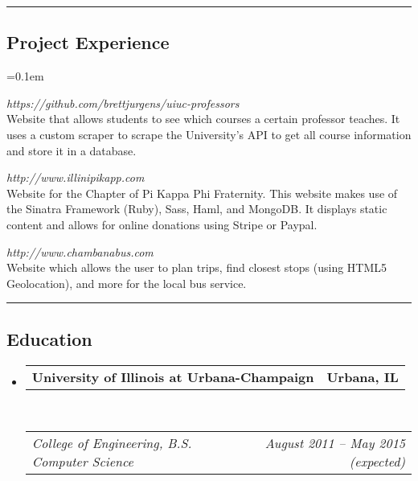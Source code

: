 \documentclass[10pt,letterpaper]{article}
\makeatletter
\newcommand{\headerrow}[2]
{\begin{tabular*}{\linewidth}{l@{\extracolsep{\fill}}r}
	#1 &
	#2 \\
\end{tabular*}}
\makeatother
\begin{document}
\hrule
\vspace{-0.4em}
\subsection*{Project Experience}
\begin{description}[leftmargin=0pt]
	\parskip=0.1em
      
	\item[UIUC Professors] {\emph{https://github.com/brettjurgens/uiuc-professors}}\hfill\\
      Website that allows students to see which courses a certain professor 
      teaches. It uses a custom scraper to scrape the University's API to get 
      all course information and store it in a database.

      \item[Pi Kappa Phi Illinois Chapter] {\emph{http://www.illinipikapp.com}}\hfill\\
      Website for the Chapter of Pi Kappa Phi Fraternity. This website makes use of the
      Sinatra Framework (Ruby), Sass, Haml, and MongoDB. It displays static 
      content and allows for online donations using Stripe or Paypal.
      
	\item[Chambana Bus] {\emph{http://www.chambanabus.com}}\hfill\\
      Website which allows the user to plan trips, find closest stops (using HTML5 
	Geolocation), and more for the local bus service.
	
\end{description}

\hrule
\vspace{-0.4em}
\subsection*{Education}

\begin{itemize}
	\parskip=0.1em

	\item 
	\headerrow
		{\textbf{University of Illinois at Urbana-Champaign}}
		{\textbf{Urbana, IL}}
	\\
	\headerrow
		{\emph{College of Engineering, B.S. Computer Science}}
		{\emph{August 2011 -- May 2015 (expected)}}
	\vspace{-1.5em}

\end{itemize}
\end{document}
